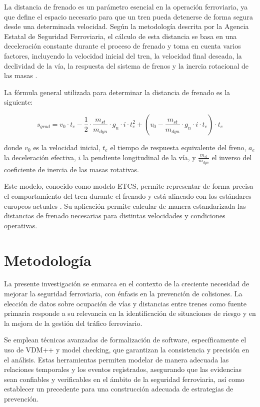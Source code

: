 \documentclass[journal]{IEEEtran}
\begin{document}
La distancia de frenado es un parámetro esencial en la operación ferroviaria, ya que define el espacio necesario para que un tren pueda detenerse de forma segura desde una determinada velocidad. Según la metodología descrita por la Agencia Estatal de Seguridad Ferroviaria, el cálculo de esta distancia se basa en una deceleración constante durante el proceso de frenado y toma en cuenta varios factores, incluyendo la velocidad inicial del tren, la velocidad final deseada, la declividad de la vía, la respuesta del sistema de frenos y la inercia rotacional de las masas \cite{aesf2023}.

La fórmula general utilizada para determinar la distancia de frenado es la siguiente:

\begin{equation}
s_{grad} = v_0 \cdot t_e - \frac{1}{2} \cdot \frac{m_{st}}{m_{dyn}} \cdot g_n \cdot i \cdot t_e^2 + \left( v_0 - \frac{m_{st}}{m_{dyn}} \cdot g_n \cdot i \cdot t_e \right) \cdot t_e
\end{equation}

donde $v_0$ es la velocidad inicial, $t_e$ el tiempo de respuesta equivalente del freno, $a_e$ la deceleración efectiva, $i$ la pendiente longitudinal de la vía, y $\frac{m_{st}}{m_{dyn}}$ el inverso del coeficiente de inercia de las masas rotativas.

Este modelo, conocido como modelo ETCS, permite representar de forma precisa el comportamiento del tren durante el frenado y está alineado con los estándares europeos actuales \cite{aesf2023}. Su aplicación permite calcular de manera estandarizada las distancias de frenado necesarias para distintas velocidades y condiciones operativas.

\section{Metodología}  

La presente investigación se enmarca en el contexto de la creciente necesidad de mejorar la seguridad ferroviaria, con énfasis en la prevención de colisiones. La elección de datos sobre ocupación de vías y distancias entre trenes como fuente primaria responde a su relevancia en la identificación de situaciones de riesgo y en la mejora de la gestión del tráfico ferroviario.  

Se emplean técnicas avanzadas de formalización de software, específicamente el uso de VDM++ y model checking, que garantizan la consistencia y precisión en el análisis. Estas herramientas permiten modelar de manera adecuada las relaciones temporales y los eventos registrados, asegurando que las evidencias sean confiables y verificables en el ámbito de la seguridad ferroviaria, así como establecer un precedente para una construcción adecuada de estrategias de prevención.  
\end{document}
